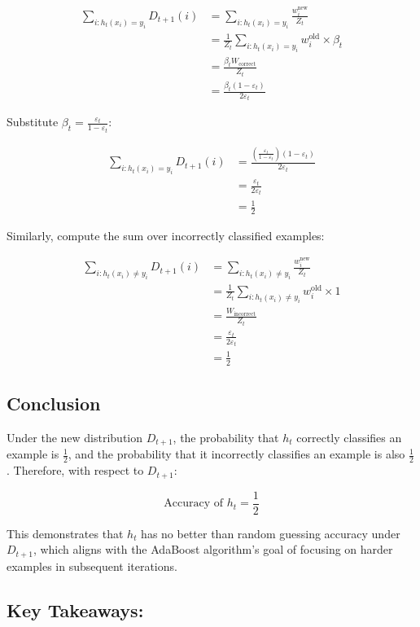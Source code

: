 \documentclass{article}
\begin{document}
\begin{align*}
\sum_{i: h_t(x_i) = y_i} D_{t+1}(i) &= \sum_{i: h_t(x_i) = y_i} \frac{w_i^{\text{new}}}{Z_t} \\
&= \frac{1}{Z_t} \sum_{i: h_t(x_i) = y_i} w_i^{\text{old}} \times \beta_t \\
&= \frac{\beta_t W_{\text{correct}}}{Z_t} \\
&= \frac{\beta_t (1 - \varepsilon_t)}{2\varepsilon_t}
\end{align*}

Substitute $\beta_t = \frac{\varepsilon_t}{1 - \varepsilon_t}$:

\begin{align*}
\sum_{i: h_t(x_i) = y_i} D_{t+1}(i) &= \frac{\left( \frac{\varepsilon_t}{1 - \varepsilon_t} \right)(1 - \varepsilon_t)}{2\varepsilon_t} \\
&= \frac{\varepsilon_t}{2\varepsilon_t} \\
&= \frac{1}{2}
\end{align*}

Similarly, compute the sum over incorrectly classified examples:

\begin{align*}
\sum_{i: h_t(x_i) \neq y_i} D_{t+1}(i) &= \sum_{i: h_t(x_i) \neq y_i} \frac{w_i^{\text{new}}}{Z_t} \\
&= \frac{1}{Z_t} \sum_{i: h_t(x_i) \neq y_i} w_i^{\text{old}} \times 1 \\
&= \frac{W_{\text{incorrect}}}{Z_t} \\
&= \frac{\varepsilon_t}{2\varepsilon_t} \\
&= \frac{1}{2}
\end{align*}

\subsection*{Conclusion}

Under the new distribution $D_{t+1}$, the probability that $h_t$ correctly classifies an example is $\frac{1}{2}$, and the probability that it incorrectly classifies an example is also $\frac{1}{2}$. Therefore, with respect to $D_{t+1}$:

\[
\text{Accuracy of } h_t = \frac{1}{2}
\]

This demonstrates that $h_t$ has no better than random guessing accuracy under $D_{t+1}$, which aligns with the AdaBoost algorithm's goal of focusing on harder examples in subsequent iterations.

\subsection*{Key Takeaways:}
\end{document}
